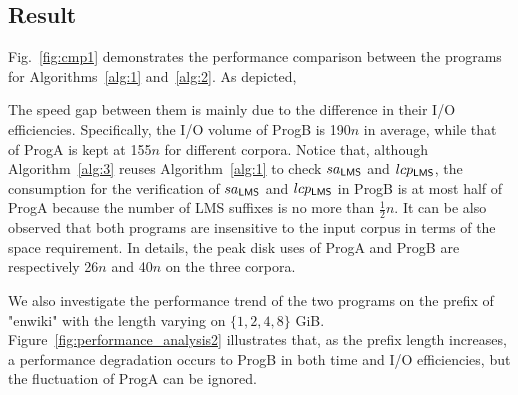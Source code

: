 \documentclass[10pt,journal,compsoc]{IEEEtran}
\begin{document}
\subsection{Result} \label{sec:experiments:result}

Fig.~\ref{fig:cmp1} demonstrates the performance comparison between the programs for Algorithms~\ref{alg:1} and~\ref{alg:2}. As depicted,







The speed gap between them is mainly due to the difference in their I/O efficiencies. Specifically, the I/O volume of ProgB is 190$n$ in average, while that of ProgA is kept at 155$n$ for different corpora. Notice that, although Algorithm~\ref{alg:3} reuses Algorithm~\ref{alg:1} to check $sa_{\sf LMS}$ and $lcp_{\sf LMS}$, the consumption for the verification of $sa_{\sf LMS}$ and $lcp_{\sf LMS}$ in ProgB is at most half of ProgA because the number of LMS suffixes is no more than $\frac{1}{2}n$. It can be also observed that both programs are insensitive to the input corpus in terms of the space requirement. In details, the peak disk uses of ProgA and ProgB are respectively 26$n$ and 40$n$ on the three corpora.

We also investigate the performance trend of the two programs on the prefix of "enwiki" with the length varying on $\{1, 2, 4, 8\}$ GiB. Figure~\ref{fig:performance_analysis2} illustrates that, as the prefix length increases, a performance degradation occurs to ProgB in both time and I/O efficiencies, but the fluctuation of ProgA can be ignored.
\end{document}
